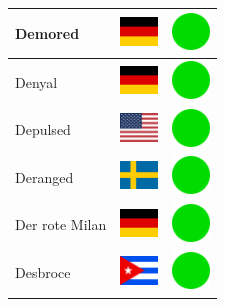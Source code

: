 \documentclass[12pt, a4paper, twoside]{report}
\begin{document}
\begin{center}
\begin{longtable}{|p{5cm}|p{2cm}|p{2cm}|}
			Demored & \includegraphics[width=1cm]{4x3/de} & \includegraphics[width=1cm]{likes/y} \\ \hline
			Denyal & \includegraphics[width=1cm]{4x3/de} & \includegraphics[width=1cm]{likes/y} \\ \hline
			Depulsed & \includegraphics[width=1cm]{4x3/us} & \includegraphics[width=1cm]{likes/y} \\ \hline
			Deranged & \includegraphics[width=1cm]{4x3/se} & \includegraphics[width=1cm]{likes/y} \\ \hline
			Der rote Milan & \includegraphics[width=1cm]{4x3/de} & \includegraphics[width=1cm]{likes/y} \\ \hline
			Desbroce & \includegraphics[width=1cm]{4x3/cu} & \includegraphics[width=1cm]{likes/y} \\ \hline

\end{longtable}
\end{center}
\end{document}
